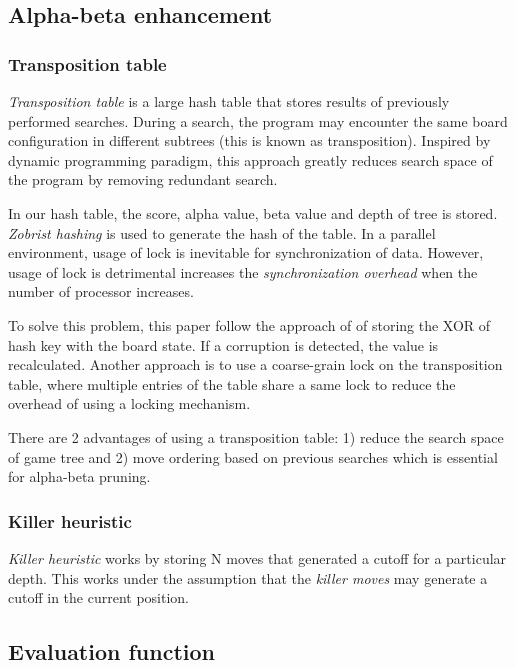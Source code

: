 \documentclass[12pt]{article}
\begin{document}
\subsection{Alpha-beta enhancement}

\subsubsection{Transposition table}

\textit{Transposition table} is a large hash table that stores results of
previously performed searches. During a search, the program may encounter the
same board configuration in different subtrees (this is known as transposition).
Inspired by dynamic programming  paradigm, this approach greatly reduces search
space of the program by removing redundant search.

In our hash table, the score, alpha value, beta value and depth of tree is
stored. \textit{Zobrist hashing} is used to generate the hash of the table. In a
parallel environment, usage of lock is inevitable for synchronization of data.
However, usage of lock is detrimental increases the \textit{synchronization
  overhead} when the number of processor increases.

To solve this problem, this paper follow the approach of
\cite{rasmussen2004parallel} of storing the XOR of hash key with the board
state. If a corruption is detected, the value is recalculated. Another approach
is to use a coarse-grain lock on the transposition table, where multiple entries
of the table share a same lock to reduce the overhead of using a locking mechanism.

There are 2 advantages of using a transposition table: 1) reduce the search
space of game tree and 2) move ordering based on previous searches which is
essential for alpha-beta pruning.


\subsubsection{Killer heuristic}

\textit{Killer heuristic} works by storing N moves that generated a cutoff for a
particular depth. This works under the assumption that the \textit{killer moves}
may generate a cutoff in the current position.

\subsection{Evaluation function}
\end{document}
